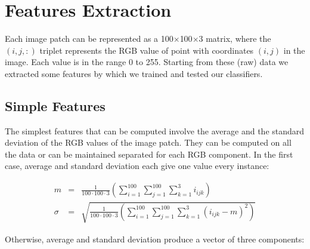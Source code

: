 \vspace{0.5cm}




\section{Features Extraction}
\label{ch4:FE}

Each image patch can be represented as a 100$\times$100$\times$3 matrix, where the $(i,j,:)$ triplet represents the RGB value of point with coordinates $(i,j)$ in the image.
Each value is in the range 0 to 255. Starting from these (raw) data we extracted some features by which we trained and tested our classifiers.

\vspace{0.5cm}

\subsection{Simple Features}

The simplest features that can be computed involve the average and the standard deviation of the \Gls{RGB} values of the image patch. They can be computed on all the data or can be maintained separated
for each \Gls{RGB} component. In the first case, average and standard deviation each give one value every instance:

\begin{eqnarray}
 m & = & \frac{1}{100\cdot100\cdot3} \left( \sum_{i=1}^{100} \sum_{j=1}^{100} \sum_{k=1}^{3} i_{ijk} \right) \\
 \sigma & = & \sqrt{\frac{1}{100\cdot100\cdot3} \left( \sum_{i=1}^{100} \sum_{j=1}^{100} \sum_{k=1}^{3} (i_{ijk} - m )^2 \right)}
\end{eqnarray}

Otherwise, average and standard deviation produce a vector of three components:

